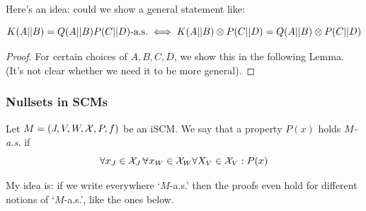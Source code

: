 Here's an idea: could we show a general statement like:
\begin{Con}
  $$K(A||B) = Q(A||B) P(C||D)\text{-a.s.} \iff K(A||B) \otimes P(C||D) = Q(A||B) \otimes P(C||D)$$
\end{Con}
\begin{proof}
  For certain choices of $A,B,C,D$, we show this in the following Lemma.
  (It's not clear whether we need it to be more general).
\end{proof}

\subsubsection{Nullsets in SCMs}

\begin{Def}\label{def:M-as}
  Let $M = \left ( J, V, W, \mathcal{X}, P, f \right )$ be an iSCM.
  We say that a property $P(x)$ holds \emph{$M$-a.s.} if
  $$\forall x_J \in \CX_J \foralmostall x_W \in \CX_W \forall X_V \in \CX_V : P(x)$$
\end{Def}
My idea is: if we write everywhere `$M$-a.s.' then the proofs even hold for different notions of `$M$-a.s.', like the ones below.

